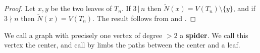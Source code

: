 \documentclass[dvipsnames,10pt]{article}
\begin{document}
\begin{proof}
    Let $x,y$ be the two leaves of $T_n$. If $3\,|\,n$ then $\tilde{N}(x)=V(T_n)\setminus \{y\}$, and if $3\nmid n$ then $\tilde{N}(x)=V(T_n)$. The result follows from  and .
\end{proof}

We call a graph with precisely one vertex of degree $>2$ a \textbf{spider}. We call this vertex the center, and call by limbs the paths between the center and a leaf.


\vspace{10pt}
\begin{center}

\begin{tikzpicture}[x=0.75pt,y=0.75pt,yscale=-1,xscale=1]


\end{tikzpicture}
\end{center}
\end{document}

